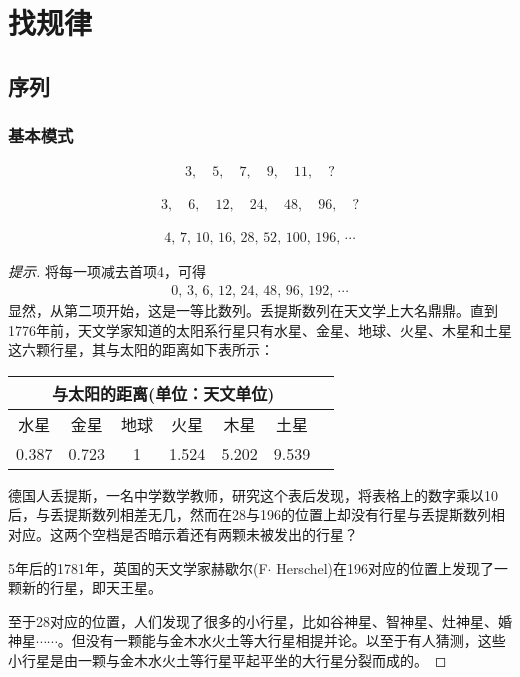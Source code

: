 
\chapter{找规律}
\label{chap:pattern}

\section{序列}
\label{sec:series-pattern}

\subsection{基本模式}
\label{sec:basic-patterns-of-sequences}

\begin{example}[等差数列]
  \begin{align*}
    3,\quad 5,\quad 7,\quad 9,\quad 11,\quad ?
  \end{align*}
\end{example}

\begin{example}[等比数列]
  \begin{align*}
    3,\quad 6,\quad 12,\quad 24,\quad 48,\quad 96,\quad ?
  \end{align*}
\end{example}

\begin{example}[丢提斯数列]
  \begin{align*}
    4,\, 7,\, 10,\, 16,\, 28,\, 52,\, 100,\, 196,\, \cdots
  \end{align*}
\end{example}
\begin{proof}[提示]
  将每一项减去首项4，可得
  \begin{align*}
    0,\, 3,\, 6,\, 12,\, 24,\, 48,\, 96,\, 192,\, \cdots
  \end{align*}
  显然，从第二项开始，这是一等比数列。丢提斯数列在天文学上大名鼎鼎。直到1776年前，天文学家知道的太阳系行星只有水星、金星、地球、火星、木星和土星这六颗行星，其与太阳的距离如下表所示：
  \begin{center}
    \begin{tabular}{ccccccc}
      \multicolumn{6}{c}{与太阳的距离(单位：天文单位)}\\
      \hline
      水星 & 金星 & 地球 & 火星 & 木星 & 土星\\
      \hline
      0.387 & 0.723 & 1 & 1.524 & 5.202 & 9.539\\
      \hline
    \end{tabular}
  \end{center}
  德国人丢提斯，一名中学数学教师，研究这个表后发现，将表格上的数字乘以10后，与丢提斯数列相差无几，然而在28与196的位置上却没有行星与丢提斯数列相对应。这两个空档是否暗示着还有两颗未被发出的行星？

  5年后的1781年，英国的天文学家赫歇尔(F$\cdot$ Herschel)在196对应的位置上发现了一颗新的行星，即天王星。

  至于28对应的位置，人们发现了很多的小行星，比如谷神星、智神星、灶神星、婚神星$\cdots\cdots$。但没有一颗能与金木水火土等大行星相提并论。以至于有人猜测，这些小行星是由一颗与金木水火土等行星平起平坐的大行星分裂而成的。
\end{proof}


